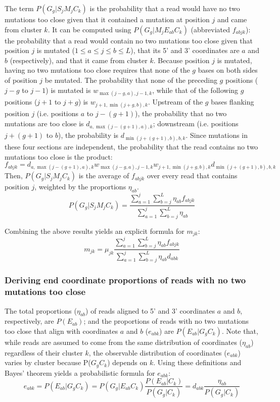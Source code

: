 \documentclass[../../MainTexts/main.tex]{subfiles}
\begin{document}
The term $P(G_g | S_j M_j C_k)$ is the probability that a read would have no two mutations too close given that it contained a mutation at position $j$ and came from cluster $k$.
It can be computed using $P(G_g | M_j E_{ab} C_k)$ (abbreviated $f_{abjk}$): the probability that a read would contain no two mutations too close given that position $j$ is mutated ($1 \le a \le j \le b \le L$), that its 5' and 3' coordinates are $a$ and $b$ (respectively), and that it came from cluster $k$.
Because position $j$ is mutated, having no two mutations too close requires that none of the $g$ bases on both sides of position $j$ be mutated.
The probability that none of the preceding $g$ positions ($j - g$ to $j - 1$) is mutated is $w_{\max(j-g,a),j-1,k}$, while that of the following $g$ positions ($j + 1$ to $j + g$) is $w_{j+1,\min(j+g,b),k}$.
Upstream of the $g$ bases flanking position $j$ (i.e. positions $a$ to $j - (g + 1)$), the probability that no two mutations are too close is $d_{a,\max(j-(g+1),a),k}$; downstream (i.e. positions $j + (g + 1)$ to $b$), the probability is $d_{\min(j+(g+1),b),b,k}$.
Since mutations in these four sections are independent, the probability that the read contains no two mutations too close is the product:
$$f_{abjk} = d_{a,\max(j-(g+1),a),k} w_{\max(j-g,a),j-1,k} w_{j+1,\min(j+g,b),k} d_{\min(j+(g+1),b),b,k}$$
Then, $P(G_g | S_j M_j C_k)$ is the average of $f_{abjk}$ over every read that contains position $j$, weighted by the proportions $\eta_{ab}$.
$$P(G_g | S_j M_j C_k) = \frac{\sum_{a=1}^{j}\sum_{b=j}^{L}\eta_{ab} f_{abjk}}{\sum_{a=1}^{j}\sum_{b=j}^{L}\eta_{ab}}$$

Combining the above results yields an explicit formula for $m_{jk}$:
$$m_{jk} = \mu_{jk} \frac{\sum_{a=1}^{j}\sum_{b=j}^{L}\eta_{ab} f_{abjk}}{\sum_{a=1}^{j}\sum_{b=j}^{L}\eta_{ab}d_{abk}}$$

\subsubsection{Deriving end coordinate proportions of reads with no two mutations too close}
\label{calc_p_ends_noclose}

The total proportions ($\eta_{ab}$) of reads aligned to 5' and 3' coordinates $a$ and $b$, respectively, are $P(E_{ab})$; and the proportions of reads with no two mutations too close that align with coordinates $a$ and $b$ ($e_{abk}$) are $P(E_{ab} | G_g C_k)$.
Note that, while reads are assumed to come from the same distribution of coordinates ($\eta_{ab}$) regardless of their cluster $k$, the observable distribution of coordinates ($e_{abk}$) varies by cluster because P($G_g C_k$) depends on $k$.
Using these definitions and Bayes' theorem yields a probabilistic formula for $e_{abk}$:
$$e_{abk} = P(E_{ab} | G_g C_k) = P(G_g | E_{ab} C_k) \frac{P(E_{ab} | C_k)}{P(G_g | C_k)} = d_{abk} \frac{\eta_{ab}}{P(G_g | C_k)}$$
\end{document}
